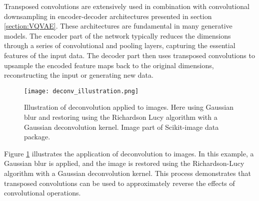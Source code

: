 \documentclass[../../thesis.tex]{subfiles}
\begin{document}
Transposed convolutions are extensively used in combination with convolutional downsampling in encoder-decoder architectures presented in section \ref{section:VQVAE}. These architectures are fundamental in many generative models. The encoder part of the network typically reduces the dimensions through a series of convolutional and pooling layers, capturing the essential features of the input data. The decoder part then uses transposed convolutions to upsample the encoded feature maps back to the original dimensions, reconstructing the input or generating new data.\newline

\begin{figure}[h]
    \centering
    \texttt{[image: deconv\_illustration.png]}
    \caption{Illustration of deconvolution applied to images. Here using Gaussian blur and restoring using the Richardson Lucy algorithm with a Gaussian deconvolution kernel. Image part of Scikit-image data package.}
    \label{fig:deconv}
\end{figure}

Figure \ref{fig:deconv} illustrates the application of deconvolution to images. In this example, a Gaussian blur is applied, and the image is restored using the Richardson-Lucy algorithm with a Gaussian deconvolution kernel. This process demonstrates that transposed convolutions can be used to approximately reverse the effects of convolutional operations.








\end{document}
